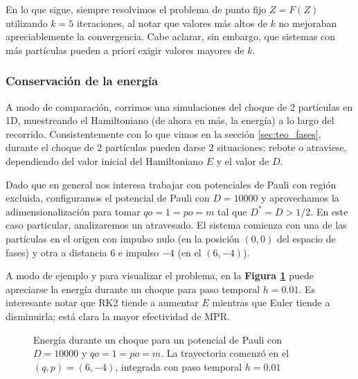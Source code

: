 En lo que sigue, siempre resolvimos el problema de punto fijo $Z = F(Z)$ utilizando $k=5$ iteraciones, al notar que valores más altos de $k$ no mejoraban apreciablemente la convergencia.
Cabe aclarar, sin embargo, que sistemas con más partículas pueden a priori exigir valores mayores de $k$.

\subsubsection{Conservación de la energía}

A modo de comparación, corrimos una simulaciones del choque de 2 partículas en 1D, muestreando el Hamiltoniano (de ahora en más, la energía) a lo largo del recorrido.
Consistentemente con lo que vimos en la sección \ref{sec:teo_fases}, durante el choque de 2 partículas pueden darse 2 situaciones: rebote o atraviese, dependiendo del valor inicial del Hamiltoniano $E$ y el valor de $D$.

Dado que en general nos interesa trabajar con potenciales de Pauli con región excluida, configuramos el potencial de Pauli con $D = 10000$ y aprovechamos la adimensionalización para tomar $qo = 1 = po = m$ tal que $D^*=D>1/2$.
En este caso particular, analizaremos un atravesado.
El sistema comienza con una de las partículas en el origen con impulso nulo (en la posición $(0, 0)$ del espacio de fases) y otra a distancia $6$ e impulso $-4$ (en el $(6, -4)$).

A modo de ejemplo y para visualizar el problema, en la \textbf{Figura \ref{fig:energ_choq}} puede apreciarse la energía durante un choque para paso temporal $h=0.01$.
Es interesante notar que RK2 tiende a aumentar $E$ mientras que Euler tiende a disminuirla; está clara la mayor efectividad de MPR.

\begin{figure}[h]
	\centering
	\caption{Energía durante un choque para un potencial de Pauli con $D = 10000$ y $qo = 1 = po = m$. La trayectoria comenzó en el $(q, p) = (6, -4)$, integrada con paso temporal $h=0.01$}
	\label{fig:energ_choq}
\end{figure}

